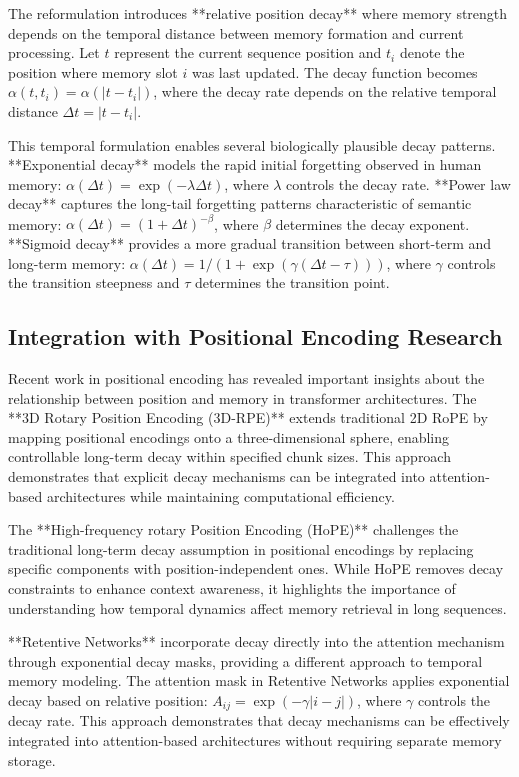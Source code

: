 \documentclass{article}
\begin{document}
The reformulation introduces **relative position decay** where memory strength depends on the temporal distance between memory formation and current processing. Let $t$ represent the current sequence position and $t_i$ denote the position where memory slot $i$ was last updated. The decay function becomes $\alpha(t, t_i) = \alpha(|t - t_i|)$, where the decay rate depends on the relative temporal distance $\Delta t = |t - t_i|$.

This temporal formulation enables several biologically plausible decay patterns. **Exponential decay** models the rapid initial forgetting observed in human memory: $\alpha(\Delta t) = \exp(-\lambda \Delta t)$, where $\lambda$ controls the decay rate. **Power law decay** captures the long-tail forgetting patterns characteristic of semantic memory: $\alpha(\Delta t) = (1 + \Delta t)^{-\beta}$, where $\beta$ determines the decay exponent. **Sigmoid decay** provides a more gradual transition between short-term and long-term memory: $\alpha(\Delta t) = 1 / (1 + \exp(\gamma(\Delta t - \tau)))$, where $\gamma$ controls the transition steepness and $\tau$ determines the transition point.

\subsection{Integration with Positional Encoding Research}

Recent work in positional encoding has revealed important insights about the relationship between position and memory in transformer architectures. The **3D Rotary Position Encoding (3D-RPE)** \cite{3d-rpe2024} extends traditional 2D RoPE by mapping positional encodings onto a three-dimensional sphere, enabling controllable long-term decay within specified chunk sizes. This approach demonstrates that explicit decay mechanisms can be integrated into attention-based architectures while maintaining computational efficiency.

The **High-frequency rotary Position Encoding (HoPE)** \cite{hope2024} challenges the traditional long-term decay assumption in positional encodings by replacing specific components with position-independent ones. While HoPE removes decay constraints to enhance context awareness, it highlights the importance of understanding how temporal dynamics affect memory retrieval in long sequences.

**Retentive Networks** \cite{retnet2023} incorporate decay directly into the attention mechanism through exponential decay masks, providing a different approach to temporal memory modeling. The attention mask in Retentive Networks applies exponential decay based on relative position: $A_{ij} = \exp(-\gamma |i - j|)$, where $\gamma$ controls the decay rate. This approach demonstrates that decay mechanisms can be effectively integrated into attention-based architectures without requiring separate memory storage.
\end{document}
